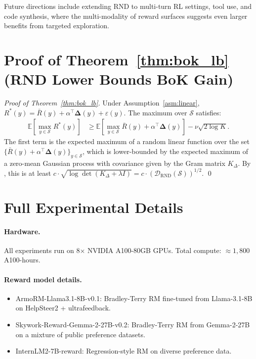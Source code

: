 \documentclass{article}
\newcommand{\E}{\mathbb{E}}
\newcommand{\cS}{\mathcal{S}}
\newcommand{\Rbar}{\bar{R}}
\newcommand{\Rstar}{R^{*}}
\newcommand{\DRND}{\mathcal{D}_{\mathrm{RND}}}
\newcommand{\Deltavec}{\boldsymbol{\Delta}}
\begin{document}
Future directions include extending RND to multi-turn RL settings, tool use,
and code synthesis, where the multi-modality of reward surfaces suggests
even larger benefits from targeted exploration.




\appendix

\section{Proof of Theorem~\ref{thm:bok_lb} (RND Lower Bounds BoK Gain)}
\label{app:proof_bok}

\begin{proof}[Proof of Theorem~\ref{thm:bok_lb}]
Under Assumption~\ref{asm:linear}, $\Rstar(y) = \Rbar(y) + \alpha^\top\Deltavec(y) + \varepsilon(y)$.
The maximum over $\cS$ satisfies:
\begin{align}
  \E\!\left[\max_{y\in\cS} \Rstar(y)\right]
  &\ge \E\!\left[\max_{y\in\cS} \Rbar(y) + \alpha^\top\Deltavec(y)\right]
  - \nu\sqrt{2\log K}.
\end{align}
The first term is the expected maximum of a random linear function over
the set $\{\Rbar(y) + \alpha^\top\Deltavec(y)\}_{y\in\cS}$, which is
lower-bounded by the expected maximum of a zero-mean Gaussian process
with covariance given by the Gram matrix $K_\Delta$.  By
\citet{gordon1985some}, this is at least $c\cdot\sqrt{\log\det(K_\Delta + \lambda I)}
= c\cdot(\DRND(\cS))^{1/2}$. \qed
\end{proof}

\section{Full Experimental Details}
\label{app:exp_details}

\paragraph{Hardware.}  All experiments run on 8$\times$ NVIDIA A100-80GB GPUs.
Total compute: $\approx 1{,}800$ A100-hours.

\paragraph{Reward model details.}
\begin{itemize}
  \item ArmoRM-Llama3.1-8B-v0.1: Bradley-Terry RM fine-tuned from
    Llama-3.1-8B on HelpSteer2 + ultrafeedback.
  \item Skywork-Reward-Gemma-2-27B-v0.2: Bradley-Terry RM from Gemma-2-27B
    on a mixture of public preference datasets.
  \item InternLM2-7B-reward: Regression-style RM on diverse preference data.
\end{itemize}
\end{document}
